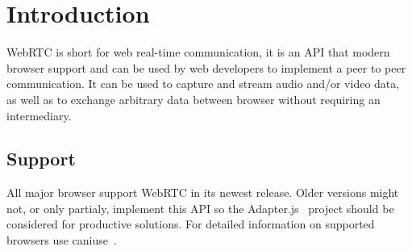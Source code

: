 \clearpage
\chapter{Introduction}
WebRTC is short for web real-time communication, it is an API that modern browser support and can be used by web developers to implement a peer to peer communication. It can be used to capture and stream audio and/or video data, as well as to exchange arbitrary data between browser without requiring an intermediary.

\section{Support}
All major browser support WebRTC in its newest release. Older versions might not, or only partialy, implement this API so the Adapter.js~\autocite{adapterjs} project should be considered for productive solutions. For detailed information on supported browsers use caniuse~\autocite{caniuse}.